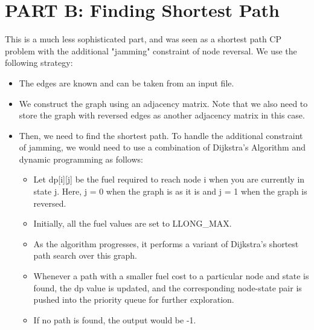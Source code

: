 \documentclass{article}
\begin{document}
\section{PART B: Finding Shortest Path} 

This is a much less sophisticated part, and was seen as a shortest path CP problem with the additional "jamming" constraint of node reversal. We use the following strategy:

\begin{itemize}
    \item The edges are known and can be taken from an input file.
    \item We construct the graph using an adjacency matrix. Note that we also need to store the graph with reversed edges as another adjacency matrix in this case.
    \item Then, we need to find the shortest path. To handle the additional constraint of jamming, we would need to use a combination of Dijkstra's Algorithm and dynamic programming as follows:
    \begin{itemize}
        \item Let dp[i][j] be the fuel required to reach node i when you are currently in state j. Here, j = 0 when the graph is as it is and j = 1 when the graph is reversed.
        \item Initially, all the fuel values are set to LLONG\_MAX.
        \item As the algorithm progresses, it performs a variant of Dijkstra’s shortest path search over this graph.
        \item Whenever a path with a smaller fuel cost to a particular node and state is found, the dp value is updated, and the corresponding node-state pair is pushed into the priority queue for further exploration.
        \item If no path is found, the output would be -1.
    \end{itemize}
\end{itemize}
\end{document}

